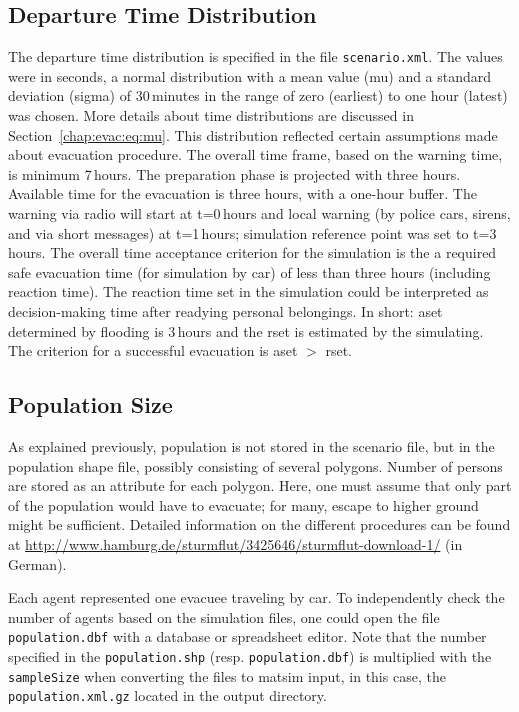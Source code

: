 \subsection{Departure Time Distribution}
The departure time distribution is specified in the file  \lstinline|scenario.xml|. The values were in seconds, \ie a normal distribution with a mean value (mu) and a standard deviation (sigma) of 30\,minutes in the range of zero (earliest) to one hour (latest) was chosen. 
More details about time distributions are discussed in Section~\ref{chap:evac:eq:mu}. This distribution reflected certain assumptions made about evacuation procedure. The overall time frame, based on the warning time, is minimum 7\,hours. The preparation phase is projected with three hours. Available time for the evacuation is three hours, with a one-hour buffer. 
The warning via radio will start at t=0\,hours and local warning (\eg by police cars, sirens, and via short messages) at t=1\,hours; simulation reference point was set to t=3\,hours. The overall time acceptance criterion for the simulation is the a required safe evacuation time (for simulation by car) of less than three hours (including reaction time). The reaction time set in the simulation could be interpreted as decision-making time after readying personal belongings. In short: \gls{aset} determined by flooding is 3\,hours and the \gls{rset} is estimated by the simulating. The criterion for a successful evacuation is \gls{aset} $>$ \gls{rset}.

\subsection{Population Size}
As explained previously, population is not stored in the scenario file, but in the population shape file, possibly consisting of several polygons. Number of persons are stored as an attribute for each polygon. Here, one must assume that only part of the population would have to evacuate; for many, escape to higher ground might be sufficient. Detailed information on the different procedures can be found at \url{http://www.hamburg.de/sturmflut/3425646/sturmflut-download-1/} (in German).

Each agent represented one evacuee traveling by car. To independently check the number of agents based on the simulation files, one could open the file \lstinline|population.dbf| with a database or spreadsheet editor. Note that the number specified in the \lstinline|population.shp| (resp. \lstinline|population.dbf|) is multiplied with the \lstinline|sampleSize| when converting the files to \gls{matsim} input, \ie in this case, the \lstinline|population.xml.gz| located in the output directory.


